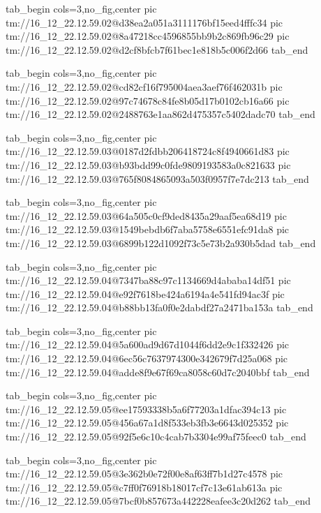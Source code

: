  
 
 
 
 

\qqSecCmtScr


\ifcmt
  tab_begin cols=3,no_fig,center
    pic tm://16_12_22.12.59.02@d38ea2a051a3111176bf15eed4fffc34
    pic tm://16_12_22.12.59.02@8a47218cc4596855bb9b2c869fb96c29
    pic tm://16_12_22.12.59.02@d2cf8bfcb7f61bec1e818b5c006f2d66
  tab_end
\fi


\ifcmt
  tab_begin cols=3,no_fig,center
    pic tm://16_12_22.12.59.02@cd82cf16f795004aea3aef76f462031b
    pic tm://16_12_22.12.59.02@97c74678c84fe8b05d17b0102cb16a66
    pic tm://16_12_22.12.59.02@2488763e1aa862d475357c5402dadc70
  tab_end
\fi


\ifcmt
  tab_begin cols=3,no_fig,center
    pic tm://16_12_22.12.59.03@0187d2fdbb206418724c8f4940661d83
    pic tm://16_12_22.12.59.03@b93bdd99c0fde9809193583a0c821633
    pic tm://16_12_22.12.59.03@765f8084865093a503f0957f7e7dc213
  tab_end
\fi


\ifcmt
  tab_begin cols=3,no_fig,center
    pic tm://16_12_22.12.59.03@64a505c0cf9ded8435a29aaf5ea68d19
    pic tm://16_12_22.12.59.03@1549bebdb6f7aba5758e6551efc91da8
    pic tm://16_12_22.12.59.03@6899b122d1092f73c5e73b2a930b5dad
  tab_end
\fi


\ifcmt
  tab_begin cols=3,no_fig,center
    pic tm://16_12_22.12.59.04@7347ba88c97c1134669d4ababa14df51
    pic tm://16_12_22.12.59.04@e92f7618be424a6194a4e541fd94ac3f
    pic tm://16_12_22.12.59.04@b88bb13fa0f0e2dabdf27a2471ba153a
  tab_end
\fi


\ifcmt
  tab_begin cols=3,no_fig,center
    pic tm://16_12_22.12.59.04@5a600ad9d67d1044f6dd2e9c1f332426
    pic tm://16_12_22.12.59.04@6ec56c7637974300e342679f7d25a068
    pic tm://16_12_22.12.59.04@adde8f9e67f69ca8058c60d7c2040bbf
  tab_end
\fi


\ifcmt
  tab_begin cols=3,no_fig,center
    pic tm://16_12_22.12.59.05@ee17593338b5a6f77203a1dfac394c13
    pic tm://16_12_22.12.59.05@456a67a1d8f533eb3fb3e6643d025352
    pic tm://16_12_22.12.59.05@92f5e6c10c4cab7b3304e99af75feec0
  tab_end
\fi


\ifcmt
  tab_begin cols=3,no_fig,center
    pic tm://16_12_22.12.59.05@3e362b0e72f00e8af63ff7b1d27c4578
    pic tm://16_12_22.12.59.05@c7ff0f76918b18017cf7c13e61ab613a
    pic tm://16_12_22.12.59.05@7bcf0b857673a442228eafee3c20d262
  tab_end
\fi


